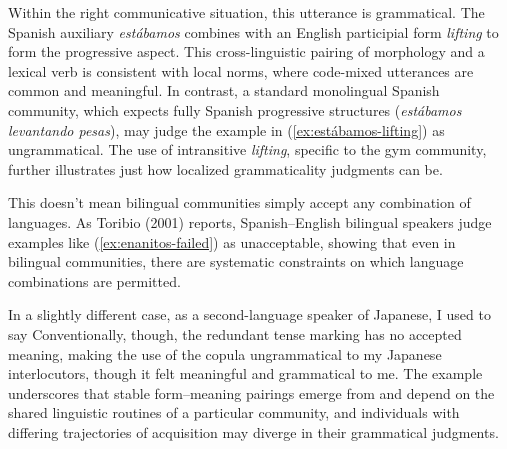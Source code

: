 \documentclass[12pt,letterpaper]{article}
\begin{document}
 \label{ex:estábamos-lifting}
\z
Within the right communicative situation, this utterance is grammatical. The Spanish auxiliary \textit{estábamos} combines with an English participial form \textit{lifting} to form the progressive aspect. This cross-linguistic pairing of morphology and a lexical verb is consistent with local norms, where code-mixed utterances are common and meaningful. In contrast, a standard monolingual Spanish community, which expects fully Spanish progressive structures (\textit{estábamos levantando pesas}), may judge the example in (\ref{ex:estábamos-lifting}) as ungrammatical. The use of intransitive \textit{lifting}, specific to the gym community, further illustrates just how localized grammaticality judgments can be.

This doesn't mean bilingual communities simply accept any combination of languages. As Toribio (2001) reports, Spanish--English bilingual speakers judge examples like (\ref{ex:enanitos-failed}) as unacceptable, showing that even in bilingual communities, there are systematic constraints on which language combinations are permitted.

\label{ex:enanitos-failed}
\z

In a slightly different case, as a second-language speaker of Japanese, I used to say
\z
Conventionally, though, the redundant tense marking has no accepted meaning, making the use of the copula ungrammatical to my Japanese interlocutors, though it felt meaningful and grammatical to me. The example underscores that stable form--meaning pairings emerge from and depend on the shared linguistic routines of a particular community, and individuals with differing trajectories of acquisition may diverge in their grammatical judgments.
\end{document}
